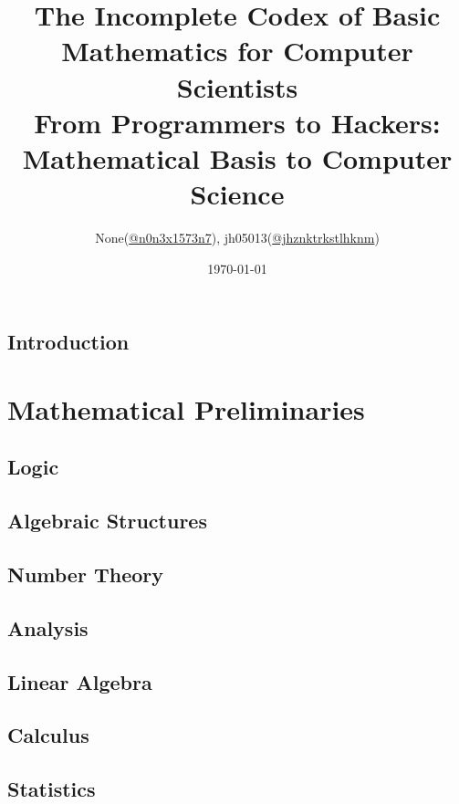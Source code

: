 \documentclass{report}
\title{
	The Incomplete Codex of Basic Mathematics for Computer Scientists\\
	\large From Programmers to Hackers: Mathematical Basis to Computer Science
}
\author{None(\href{https://www.twitter.com/n0n3x1573n7}{@n0n3x1573n7}), jh05013(\href{https://twitter.com/jhznktrkstlhknm}{@jhznktrkstlhknm})}
\date{\today}
\theoremstyle{break}
\begin{document}
	\maketitle

	\chapter{Introduction}
		
	
	\tableofcontents
	
	\part{Mathematical Preliminaries}
	
		\chapter{Logic}
			

		\chapter{Algebraic Structures}
			
	
		\chapter{Number Theory}
			
	
		\chapter{Analysis}
			
		
		\chapter{Linear Algebra}
			
		
		\chapter{Calculus}
			
		
		\chapter{Statistics}
			
\end{document}

